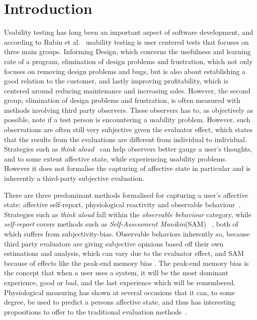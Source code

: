 
\section{Introduction}

Usability testing has long been an important aspect of software development, and according to Rubin et al.~\cite{rubin2008handbook} usability testing is user centered tests that focuses on three main groups.
Informing Design, which concerns the usefulness and learning rate of a program,
elimination of design problems and frustration, which not only focuses on removing design problems and bugs, but is also about establishing a good relation to the customer, and lastly improving profitability, which is centered around reducing maintenance and increasing sales.
However, the second group, elimination of design problems and frustration, is often measured with methods involving third party observers.
These observers has to, as objectively as possible, note if a test person is encountering a usability problem.
However, such observations are often still very subjective given the evaluator effect\cite{eval_effect}, which states that the results from the evaluations are different from individual to individual.
Strategies such as \textit{think aloud}~\cite{use_of_TA_and_IDA} can help observers better gauge a user's
thoughts, and to some extent affective state, while experiencing usability problems. However it does
not formalise the capturing of affective state in particular and is inherently a third-party
subjective evaluation. 

There are three predominant methods formalised for capturing a user's affective state: affective self-report, physiological reactivity and
observable behaviour~\cite{BRADLEY199449}. Strategies such as \textit{think
aloud} fall within the \textit{observable behaviour} category, while
\textit{self-report} covers methods such as \textit{Self-Assessment Manikin}(SAM)
~\cite{BRADLEY199449}, both of which suffers from subjectivity-bias.
Observable behaviors inherently so, because third party evaluators are giving subjective opinions based off their own estimations and analysis, which can vary due to the evaluator effect, and SAM because of effects like the peak-end memory bias \cite{cockburn_peakend}. The peak-end memory bias is the concept that when a user uses a system, it will be the most dominant experience, good or bad, and the last experience which will be remembered.
Physiological measuring has shown at several occasions that it can, to some degree, be used to predict a persons
affective state, and thus has interesting propositions to offer to the traditional evaluation methods~\cite{eeg_facial_expressions,fusion4,90_percent_eeg_emotion}.

